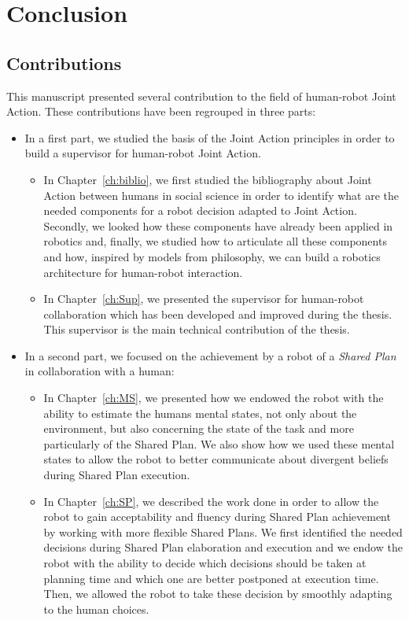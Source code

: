 \documentclass[english, a4paper,11pt,twoside]{StyleThese}
\begin{document}
\fi


\chapter*{Conclusion}

\section*{Contributions}

This manuscript presented several contribution to the field of human-robot Joint Action. These contributions have been regrouped in three parts:
\begin{itemize}
\item In a first part, we studied the basis of the Joint Action principles in order to build a supervisor for human-robot Joint Action. 
\begin{itemize}
\item In Chapter~\ref{ch:biblio}, we first studied the bibliography about Joint Action between humans in social science in order to identify what are the needed components for a robot decision adapted to Joint Action. Secondly, we looked how these components have already been applied in robotics and, finally, we studied how to articulate all these components and how, inspired by models from philosophy, we can build a robotics architecture for human-robot interaction.
\item In Chapter~\ref{ch:Sup}, we presented the supervisor for human-robot collaboration which has been developed and improved during the thesis. This supervisor is the main technical contribution of the thesis.
\end{itemize}
\item In a second part, we focused on the achievement by a robot of a \textit{Shared Plan} in collaboration with a human:
\begin{itemize}
\item In Chapter~\ref{ch:MS}, we presented how we endowed the robot with the ability to estimate the humans mental states, not only about the environment, but also concerning the state of the task and more particularly of the Shared Plan. We also show how we used these mental states to allow the robot to better communicate about divergent beliefs during Shared Plan execution.
\item In Chapter~\ref{ch:SP}, we described the work done in order to allow the robot to gain acceptability and fluency during Shared Plan achievement by working with more flexible Shared Plans. We first identified the needed decisions during Shared Plan elaboration and execution and we endow the robot with the ability to decide which decisions should be taken at planning time and which one are better postponed at execution time. Then, we allowed the robot to take these decision by smoothly adapting to the human choices.

\end{itemize}
\end{itemize}
\end{document}
